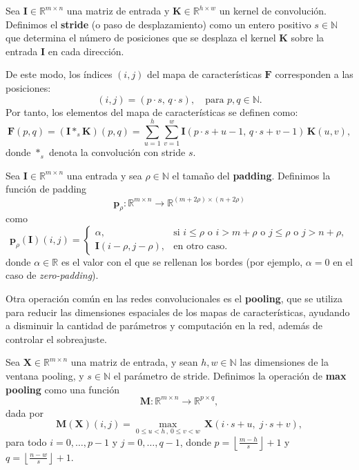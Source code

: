 \begin{definition}[Stride]
    Sea $\mathbf{I} \in \mathbb{R}^{m \times n}$ una matriz de entrada y $\mathbf{K} \in \mathbb{R}^{h \times w}$ un kernel de convolución.
    Definimos el \textbf{stride} (o paso de desplazamiento) como un entero positivo $s \in \mathbb{N}$ que determina el número de posiciones que se desplaza el kernel $\mathbf{K}$ sobre la entrada $\mathbf{I}$ en cada dirección.

    De este modo, los índices $(i,j)$ del mapa de características $\mathbf{F}$ corresponden a las posiciones:
    \[
        (i,j) = (p \cdot s,\, q \cdot s),
        \quad \text{para } p,q \in \mathbb{N}.
    \]
    Por tanto, los elementos del mapa de características se definen como:
    \[
        \mathbf{F}(p,q) = (\mathbf{I} \ast_s \mathbf{K})(p,q)
        = \sum_{u=1}^{h} \sum_{v=1}^{w}
        \mathbf{I}(p \cdot s + u - 1,\, q \cdot s + v - 1)\, \mathbf{K}(u,v),
    \]
    donde $\ast_s$ denota la convolución con stride $s$.
\end{definition}

\begin{definition}[Padding]
    Sea $\mathbf{I} \in \mathbb{R}^{m \times n}$ una entrada y sea $\rho \in \mathbb{N}$ el tamaño del \textbf{padding}.
    Definimos la función de padding
    \[
        \mathbf{p}_{\rho} : \mathbb{R}^{m \times n} \longrightarrow \mathbb{R}^{(m + 2\rho) \times (n + 2\rho)}
    \]
    como
    \[
        \mathbf{p}_\rho(\mathbf{I})(i, j) =
        \begin{cases}
            \alpha,                         & \text{si } i \leq \rho \text{ o } i > m + \rho \text{ o } j \leq \rho \text{ o } j > n + \rho, \\[6pt]
            \mathbf{I}(i - \rho, j - \rho), & \text{en otro caso.}
        \end{cases}
    \]
    donde $\alpha \in \mathbb{R}$ es el valor con el que se rellenan los bordes (por ejemplo, $\alpha = 0$ en el caso de \textit{zero-padding}).
\end{definition}

Otra operación común en las redes convolucionales es el \textbf{pooling}, que se utiliza para reducir las dimensiones espaciales de los mapas de características, ayudando a disminuir la cantidad de parámetros y computación en la red, además de controlar el sobreajuste.

\begin{definition}

    Sea $\mathbf{X} \in \mathbb{R}^{m \times n}$ una matriz de entrada, y sean $h, w \in \mathbb{N}$ las dimensiones de la ventana pooling, y $s \in \mathbb{N}$ el parámetro de stride.
    Definimos la operación de \textbf{max pooling} como una función
    \[
        \mathbf{M}: \mathbb{R}^{m \times n} \longrightarrow \mathbb{R}^{p \times q},
    \]
    dada por
    \[
        \mathbf{M}(\mathbf{X})(i,j) =
        \max_{0 \leq u < h \, , \, 0 \leq v < w}
        \, \mathbf{X}(i \cdot s + u,\; j \cdot s + v),
    \]
    para todo $i = 0, \ldots, p-1$ y $j = 0, \ldots, q-1$,
    donde $p = \left\lfloor \frac{m - h}{s} \right\rfloor + 1$ y $q = \left\lfloor \frac{n - w}{s} \right\rfloor + 1$.
\end{definition}

